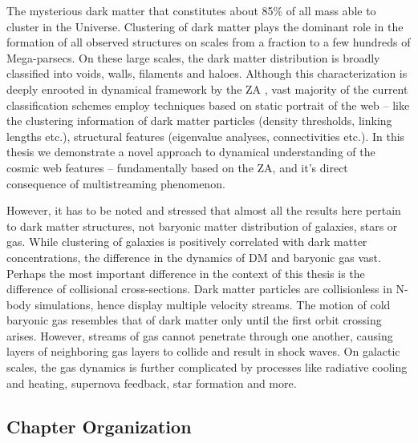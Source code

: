 The mysterious dark matter that constitutes about 85\% of all mass able to cluster in the Universe. Clustering of dark matter plays the dominant role in the formation of all observed structures on scales from a fraction to a few hundreds of Mega-parsecs. On these large scales, the dark matter distribution is broadly classified into voids, walls, filaments and haloes. Although this characterization is deeply enrooted in dynamical framework by the ZA \citep{Zeldovich1970, Shandarin1989}, vast majority of the current classification schemes employ techniques based on static portrait of the web -- like the clustering information of dark matter particles (density thresholds, linking lengths etc.), structural features (eigenvalue analyses, connectivities etc.). In this thesis we demonstrate a novel approach to dynamical understanding of the cosmic web features -- fundamentally based on the ZA, and it's direct consequence of multistreaming phenomenon.   

However, it has to be noted and stressed that almost all the results here pertain to dark matter structures, not baryonic matter distribution of galaxies, stars or gas. While clustering of galaxies is positively correlated with dark matter concentrations, the difference in the dynamics of DM and baryonic gas vast. Perhaps the most important difference in the context of this thesis is the difference of collisional cross-sections. Dark matter particles are collisionless in N-body simulations, hence display multiple velocity streams. The motion of cold baryonic gas resembles that of dark matter only until the first orbit crossing arises. However, streams of gas cannot penetrate through one another, causing layers of neighboring gas layers to collide and result in shock waves. On galactic scales, the gas dynamics is further complicated by processes like radiative cooling and heating, supernova feedback, star formation and more. 


\subsection{Chapter Organization}


